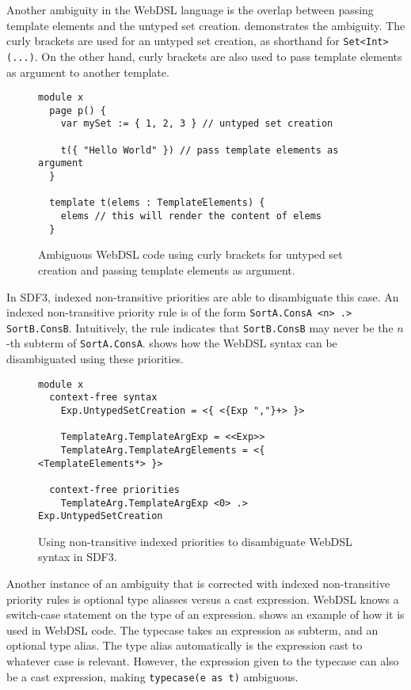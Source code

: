       Another ambiguity in the WebDSL language is the overlap between passing template elements and the untyped set creation.  demonstrates the ambiguity. The curly brackets are used for an untyped set creation, as shorthand for \texttt{Set<Int>(...)}. On the other hand, curly brackets are also used to pass template elements as argument to another template.

      \begin{figure}
        \begin{verbatim}
module x
  page p() {
    var mySet := { 1, 2, 3 } // untyped set creation

    t({ "Hello World" }) // pass template elements as argument
  }

  template t(elems : TemplateElements) {
    elems // this will render the content of elems
  }
        \end{verbatim}
        \caption{\label{fig:sdf3-webdsl-untyped-set}Ambiguous WebDSL code using curly brackets for untyped set creation and passing template elements as argument.}
      \end{figure}

      In SDF3, indexed non-transitive priorities are able to disambiguate this case. An indexed non-transitive priority rule is of the form \texttt{SortA.ConsA <n> .> SortB.ConsB}. Intuitively, the rule indicates that \texttt{SortB.ConsB} may never be the $n$-th subterm of \texttt{SortA.ConsA}.  shows how the WebDSL syntax can be disambiguated using these priorities.

      \begin{figure}
        \begin{verbatim}
module x
  context-free syntax
    Exp.UntypedSetCreation = <{ <{Exp ","}+> }>

    TemplateArg.TemplateArgExp = <<Exp>>
    TemplateArg.TemplateArgElements = <{ <TemplateElements*> }>

  context-free priorities
    TemplateArg.TemplateArgExp <0> .> Exp.UntypedSetCreation
        \end{verbatim}
        \caption{\label{fig:sdf3-non-transitive-priorities}Using non-transitive indexed priorities to disambiguate WebDSL syntax in SDF3.}
      \end{figure}

      Another instance of an ambiguity that is corrected with indexed non-transitive priority rules is optional type aliasses versus a cast expression. WebDSL knows a switch-case statement on the type of an expression.  shows an example of how it is used in WebDSL code. The typecase takes an expression as subterm, and an optional type alias. The type alias automatically is the expression cast to whatever case is relevant. However, the expression given to the typecase can also be a cast expression, making \texttt{typecase(e as t)} ambiguous.

